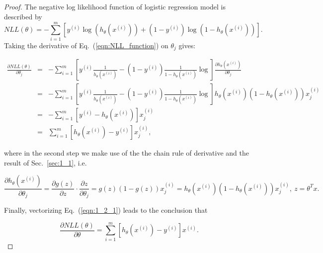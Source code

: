 \documentclass[english,11pt]{article}
\begin{document}
\subsection{}  %
\begin{proof}
The negative log likelihood function of logistic regression model is described by
\begin{equation}
NLL(\theta)=-\sum_{i=1}^{m}\left[y^{(i)}\log\left(h_{\theta}(x^{(i)})\right)+(1-y^{(i)})\log\left(1-h_{\theta}(x^{(i)})\right)\right].
\label{eqn:NLL_function}
\end{equation}
Taking the derivative of  Eq.~(\ref{eqn:NLL_function}) on $\theta_j$ gives:

\begin{eqnarray}
\frac{\partial NLL(\theta)}{\partial\theta_{j}}	& = &	-\sum_{i=1}^{m}\left[y^{(i)}\frac{1}{h_{\theta}(x^{(i)})}-(1-y^{(i)})\frac{1}{1-h_{\theta}(x^{(i)})}\log\right]\frac{\partial h_{\theta}(x^{(i)})}{\partial\theta_{j}} \\
& =&	-\sum_{i=1}^{m}\left[y^{(i)}\frac{1}{h_{\theta}(x^{(i)})}-(1-y^{(i)})\frac{1}{1-h_{\theta}(x^{(i)})}\log\right]h_{\theta}(x^{(i)})\left(1-h_{\theta}(x^{(i)})\right)x_{j}^{(i)} \\
& = &	-\sum_{i=1}^{m}\left[y^{(i)}-h_{\theta}(x^{(i)})\right]x_{j}^{(i)} \\
& = &	\sum_{i=1}^{m}\left[h_{\theta}(x^{(i)})-y^{(i)}\right]x_{j}^{(i)}, \label{eqn:1_2_1}
\end{eqnarray}

where in the second step we make use of the the chain rule of derivative and  the result of Sec.~\ref{sec:1_1}, i.e.

\begin{equation}
\frac{\partial h_{\theta}(x^{(i)})}{\partial\theta_{j}}=\frac{\partial g(z)}{\partial z}\cdot\frac{\partial z}{\partial\theta_{j}}=g(z)\left(1-g(z)\right)x_{j}^{(i)}=h_{\theta}(x^{(i)})\left(1-h_{\theta}(x^{(i)})\right)x_{j}^{(i)}, \ z=\theta^{T}x.
\end{equation} 

Finally, vectorizing Eq.~(\ref{eqn:1_2_1}) leads to the conclusion that

\begin{equation}
\frac{\partial NLL(\theta)}{\partial\theta}=\sum_{i=1}^{m}\left[h_{\theta}(x^{(i)})-y^{(i)}\right]x^{(i)}.
\end{equation}
\end{proof}
\end{document}
